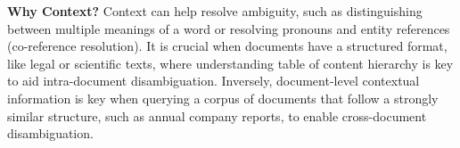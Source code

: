 \noindent\textbf{Why Context?} Context can help resolve ambiguity, such as distinguishing between multiple meanings of a word or resolving pronouns and entity references (co-reference resolution). It is crucial when documents have a structured format, like legal or scientific texts, where understanding table of content hierarchy is key to aid intra-document disambiguation. Inversely, document-level contextual information is key when querying a corpus of documents that follow a strongly similar structure, such as annual company reports, to enable cross-document disambiguation.






